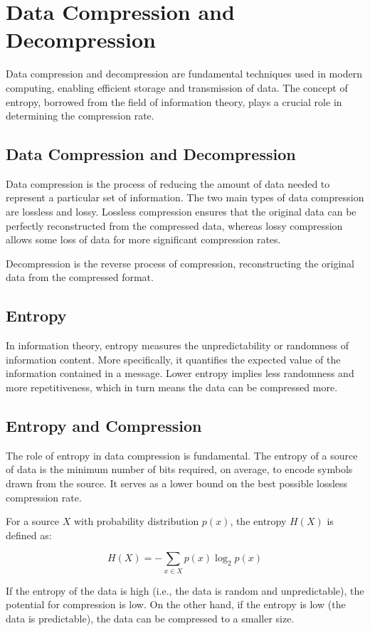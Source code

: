\chapter{Data Compression and Decompression}

Data compression and decompression are fundamental techniques used in
modern computing, enabling efficient storage and transmission of
data. The concept of entropy, borrowed from the field of information
theory, plays a crucial role in determining the compression rate.

\section{Data Compression and Decompression}

Data compression is the process of reducing the amount of data needed
to represent a particular set of information. The two main types of
data compression are lossless and lossy. Lossless compression ensures
that the original data can be perfectly reconstructed from the
compressed data, whereas lossy compression allows some loss of data
for more significant compression rates.

Decompression is the reverse process of compression, reconstructing
the original data from the compressed format.

\section{Entropy}

In information theory, entropy measures the unpredictability or
randomness of information content. More specifically, it quantifies
the expected value of the information contained in a message. Lower
entropy implies less randomness and more repetitiveness, which in turn
means the data can be compressed more.

\section{Entropy and Compression}

The role of entropy in data compression is fundamental. The entropy of
a source of data is the minimum number of bits required, on average,
to encode symbols drawn from the source. It serves as a lower bound on
the best possible lossless compression rate.

For a source $X$ with probability distribution $p(x)$, the entropy $H(X)$ is defined as:

\begin{equation}
H(X) = - \sum_{x \in X} p(x) \log_2 p(x)
\end{equation}

If the entropy of the data is high (i.e., the data is random and
unpredictable), the potential for compression is low. On the other
hand, if the entropy is low (the data is predictable), the data can be
compressed to a smaller size.

